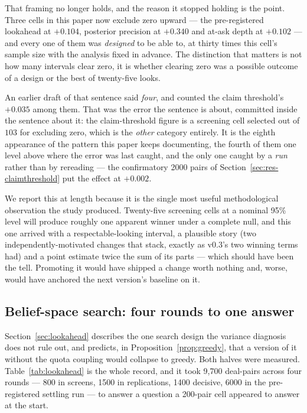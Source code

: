\documentclass[11pt,a4paper]{article}
\begin{document}
That framing no longer holds, and the reason it stopped holding is the point.
Three cells in this paper now exclude zero upward --- the pre-registered
lookahead at $+0.104$, posterior precision at $+0.340$ and at-ask depth at
$+0.102$ --- and every one of them was \emph{designed} to be able to, at thirty
times this cell's sample size with the analysis fixed in advance. The
distinction that matters is not how many intervals clear zero, it is whether
clearing zero was a possible outcome of a design or the best of twenty-five
looks.

An earlier draft of that sentence said \emph{four}, and counted the claim
threshold's $+0.035$ among them. That was the error the sentence is about,
committed inside the sentence about it: the claim-threshold figure is a
screening cell selected out of $103$ for excluding zero, which is the
\emph{other} category entirely. It is the eighth appearance of the pattern
this paper keeps documenting, the fourth of them one level above where the
error was last caught, and the only one caught by a \emph{run} rather than by
rereading --- the confirmatory 2000 pairs of
Section~\ref{sec:res-claimthreshold} put the effect at $+0.002$.

We report this at length because it is the single most useful methodological
observation the study produced. Twenty-five screening cells at a nominal 95\%
level will produce roughly one apparent winner under a complete null, and this
one arrived with a respectable-looking interval, a plausible story (two
independently-motivated changes that stack, exactly as v0.3's two winning terms
had) and a point estimate twice the sum of its parts --- which should have been
the tell. Promoting it would have shipped a change worth nothing and, worse,
would have anchored the next version's baseline on it.

\subsection{Belief-space search: four rounds to one answer}
\label{sec:res-lookahead}

Section~\ref{sec:lookahead} describes the one search design the variance
diagnosis does not rule out, and predicts, in Proposition~\ref{prop:greedy},
that a version of it without the quota coupling would collapse to greedy. Both
halves were measured. Table~\ref{tab:lookahead} is the whole record, and it took
9{,}700 deal-pairs across four rounds --- 800 in screens, 1500 in replications,
1400 decisive, 6000 in the pre-registered settling run --- to answer a question
a 200-pair cell appeared to answer at the start.
\end{document}
